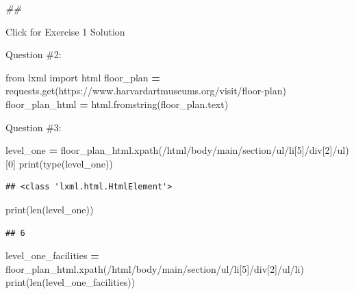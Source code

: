 \documentclass[
]{book}
\newenvironment{Shaded}{\begin{snugshade}}{\end{snugshade}}
\newcommand{\BuiltInTok}[1]{#1}
\newcommand{\CommentTok}[1]{\textcolor[rgb]{0.56,0.35,0.01}{\textit{#1}}}
\newcommand{\DecValTok}[1]{\textcolor[rgb]{0.00,0.00,0.81}{#1}}
\newcommand{\ImportTok}[1]{#1}
\newcommand{\NormalTok}[1]{#1}
\newcommand{\OperatorTok}[1]{\textcolor[rgb]{0.81,0.36,0.00}{\textbf{#1}}}
\newcommand{\StringTok}[1]{\textcolor[rgb]{0.31,0.60,0.02}{#1}}
\begin{document}
\begin{Shaded}
\begin{Highlighting}[]
\CommentTok{\#\#}
\end{Highlighting}
\end{Shaded}

{Click for Exercise 1 Solution}

\begin{alert}

Question \#2:

\begin{Shaded}
\begin{Highlighting}[]
\ImportTok{from}\NormalTok{ lxml }\ImportTok{import}\NormalTok{ html}
\NormalTok{floor\_plan }\OperatorTok{=}\NormalTok{ requests.get(}\StringTok{\textquotesingle{}https://www.harvardartmuseums.org/visit/floor{-}plan\textquotesingle{}}\NormalTok{)}
\NormalTok{floor\_plan\_html }\OperatorTok{=}\NormalTok{ html.fromstring(floor\_plan.text)}
\end{Highlighting}
\end{Shaded}

Question \#3:

\begin{Shaded}
\begin{Highlighting}[]
\NormalTok{level\_one }\OperatorTok{=}\NormalTok{ floor\_plan\_html.xpath(}\StringTok{\textquotesingle{}/html/body/main/section/ul/li[5]/div[2]/ul\textquotesingle{}}\NormalTok{)[}\DecValTok{0}\NormalTok{]}
\BuiltInTok{print}\NormalTok{(}\BuiltInTok{type}\NormalTok{(level\_one))}
\end{Highlighting}
\end{Shaded}

\begin{verbatim}
## <class 'lxml.html.HtmlElement'>
\end{verbatim}

\begin{Shaded}
\begin{Highlighting}[]
\BuiltInTok{print}\NormalTok{(}\BuiltInTok{len}\NormalTok{(level\_one))}
\end{Highlighting}
\end{Shaded}

\begin{verbatim}
## 6
\end{verbatim}

\begin{Shaded}
\begin{Highlighting}[]
\NormalTok{level\_one\_facilities }\OperatorTok{=}\NormalTok{ floor\_plan\_html.xpath(}\StringTok{\textquotesingle{}/html/body/main/section/ul/li[5]/div[2]/ul/li\textquotesingle{}}\NormalTok{)}
\BuiltInTok{print}\NormalTok{(}\BuiltInTok{len}\NormalTok{(level\_one\_facilities))}
\end{Highlighting}
\end{Shaded}


\end{alert}
\end{document}
